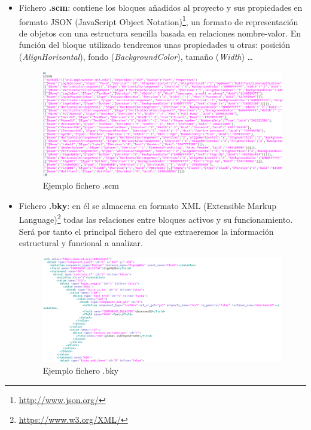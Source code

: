 \documentclass[a4paper, 12pt]{book}
\begin{document}
\begin{itemize}
  \item Fichero \textbf{.scm}: contiene los bloques añadidos al proyecto y sus propiedades en formato JSON (JavaScript Object Notation)\footnote{\url{http://www.json.org/}}, un formato de representación de objetos con una estructura sencilla basada en relaciones nombre-valor. En función del bloque utilizado tendremos unas propiedades u otras: posición (\textit{AlignHorizontal}), fondo (\textit{BackgroundColor}), tamaño (\textit{Width}) \ldots 
	\begin{figure}[H]
	  \centering
	  \includegraphics[width=\linewidth, keepaspectratio]{img/scmCode}
	  \caption{Ejemplo fichero .scm}
	  \label{fig:scmfile}
	\end{figure}
  \item Fichero \textbf{.bky}: en él se almacena en formato XML (Extensible Markup Language)\footnote{\url{https://www.w3.org/XML/}} todas las relaciones entre bloques activos y su funcionamiento. Será por tanto el principal fichero del que extraeremos la información estructural y funcional a analizar.
	\begin{figure}[H]
	  \centering
	  \includegraphics[width=\linewidth, keepaspectratio]{img/bkyCode}
	  \caption{Ejemplo fichero .bky}
	  \label{fig:bkyfile}
	\end{figure}
\end{itemize}
\end{document}
